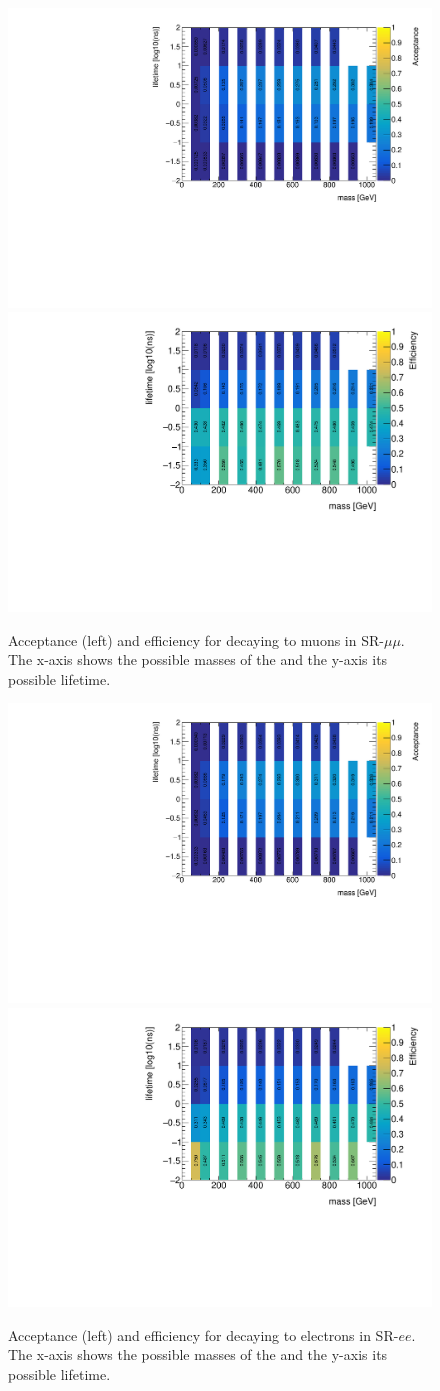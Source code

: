 \begin{figure}[htbp]
\centering
\includegraphics[width=.48\textwidth]{figures/event_selection/mm_slep_acc.pdf}
\includegraphics[width=.48\textwidth]{figures/event_selection/mm_slep_eff.pdf}
\caption{Acceptance (left) and efficiency for \smu decaying to muons in SR-$\mu\mu$. The x-axis shows the possible masses of the \smu and the y-axis its possible lifetime.}
\label{fig:acc-eff-mm}
\end{figure}

\begin{figure}[htbp]
\centering
\includegraphics[width=.48\textwidth]{figures/event_selection/ee_slep_acc.pdf}
\includegraphics[width=.48\textwidth]{figures/event_selection/ee_slep_eff.pdf}
\caption{Acceptance (left) and efficiency for \selec decaying to electrons in SR-$ee$. The x-axis shows the possible masses of the \selec and the y-axis its possible lifetime.}
\label{fig:acc-eff-ee}
\end{figure}

